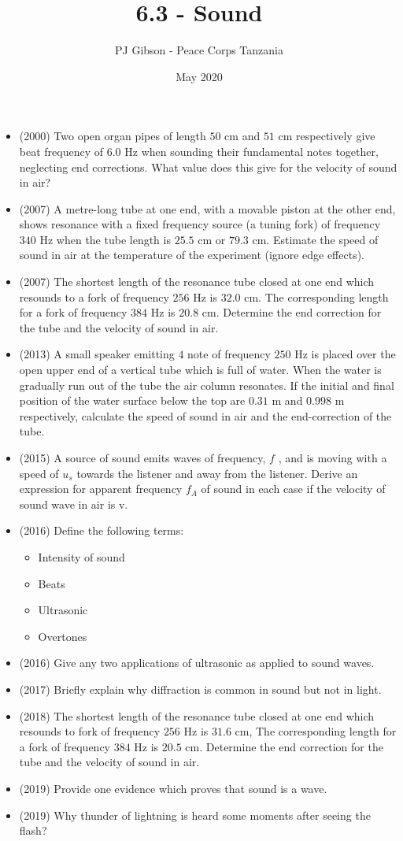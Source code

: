 \documentclass{article}
\title{\textbf{6.3 - Sound}}
\author{PJ Gibson - Peace Corps Tanzania}
\date{May 2020}
\begin{document}
\maketitle

\begin{itemize}
\item (2000)  Two open organ pipes of length $ 50$ cm and $ 51$ cm respectively give beat frequency of $ 6.0$ Hz when sounding their fundamental notes together, neglecting end corrections. What value does this give for the velocity of sound in air?
\item (2007)  A metre-long tube at one end, with a movable piston at the other end, shows resonance with a fixed frequency source (a tuning fork) of frequency $ 340$ Hz when the tube length is $ 25.5$ cm or $ 79.3$ cm.  Estimate the speed of sound in air at the temperature of the experiment (ignore edge effects).
\item (2007)  The shortest length of the resonance tube closed at one end which resounds to a fork of frequency $ 256$ Hz is $ 32.0$ cm.  The corresponding length for a fork of frequency $ 384$ Hz is $ 20.8$ cm.  Determine the end correction for the tube and the velocity of sound in air.
\item (2013)  A small speaker emitting $ 4$ note of frequency $ 250$ Hz is placed over the open upper end of a vertical tube which is full of water. When the water is gradually run out of the tube the air column resonates. If the initial and final position of the water surface below the top are $ 0.31$ m and $ 0.998$ m respectively, calculate the speed of sound in air and the end-correction of the tube. 
\item (2015)  A source of sound emits waves of frequency, $ f$ , and is moving with a speed of $ u_{s}$ towards the listener and away from the listener.  Derive an expression for apparent frequency $ f_{A}$ of sound in each case if the velocity of sound wave in air is v.  
\item (2016)  Define the following terms:
 \begin{itemize}
\item Intensity of sound
\item Beats
\item Ultrasonic
\item Overtones
\end{itemize}
\item (2016)  Give any two applications of ultrasonic as applied to sound waves.
\item (2017)  Briefly explain why diffraction is common in sound but not in light.
\item (2018)  The shortest length of the resonance tube closed at one end which resounds to fork of frequency $ 256$ Hz is $ 31.6$ cm, The corresponding length for a fork of frequency $ 384$ Hz is $ 20.5$ cm. Determine the end correction for the tube and the velocity of sound in air. 
\item (2019)  Provide one evidence which proves that sound is a wave.
\item (2019)  Why thunder of lightning is heard some moments after seeing the flash?
\end{itemize}
\end{document}
